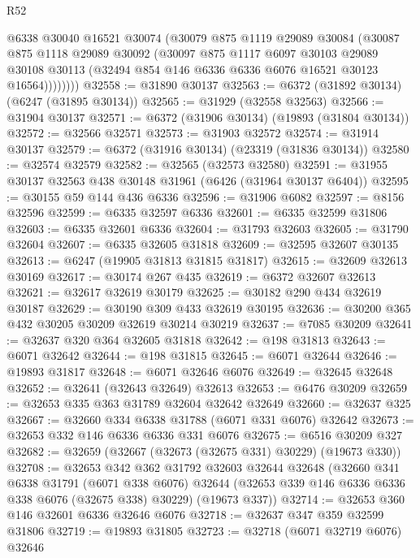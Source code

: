 \begin{lexlean}{R52}
\begin{coremodule}
            @6338
            @30040
            @16521
            @30074
            (@30079
              @875
              @1119
              @29089
              @30084
              (@30087
                @875
                @1118
                @29089
                @30092
                (@30097
                  @875
                  @1117
                  @6097
                  @30103
                  @29089
                  @30108
                  @30113
                  (@32494 @854 @146 @6336 @6336 @6076 @16521 @30123 @16564))))))))
@32558 := @31890 @30137
@32563 := @6372 (@31892 @30134) (@6247 (@31895 @30134))
@32565 := @31929 (@32558 @32563)
@32566 := @31904 @30137
@32571 := @6372 (@31906 @30134) (@19893 (@31804 @30134))
@32572 := @32566 @32571
@32573 := @31903 @32572
@32574 := @31914 @30137
@32579 := @6372 (@31916 @30134) (@23319 (@31836 @30134))
@32580 := @32574 @32579
@32582 := @32565 (@32573 @32580)
@32591 := @31955 @30137 @32563 @438 @30148 @31961 (@6426 (@31964 @30137 @6404))
@32595 := @30155 @59 @144 @436 @6336
@32596 := @31906 @6082
@32597 := @8156 @32596
@32599 := @6335 @32597 @6336
@32601 := @6335 @32599 @31806
@32603 := @6335 @32601 @6336
@32604 := @31793 @32603
@32605 := @31790 @32604
@32607 := @6335 @32605 @31818
@32609 := @32595 @32607 @30135
@32613 := @6247 (@19905 @31813 @31815 @31817)
@32615 := @32609 @32613 @30169
@32617 := @30174 @267 @435
@32619 := @6372 @32607 @32613
@32621 := @32617 @32619 @30179
@32625 := @30182 @290 @434 @32619 @30187
@32629 := @30190 @309 @433 @32619 @30195
@32636 := @30200 @365 @432 @30205 @30209 @32619 @30214 @30219
@32637 := @7085 @30209
@32641 := @32637 @320 @364 @32605 @31818
@32642 := @198 @31813
@32643 := @6071 @32642
@32644 := @198 @31815
@32645 := @6071 @32644
@32646 := @19893 @31817
@32648 := @6071 @32646 @6076
@32649 := @32645 @32648
@32652 := @32641 (@32643 @32649) @32613
@32653 := @6476 @30209
@32659 := @32653 @335 @363 @31789 @32604 @32642 @32649
@32660 := @32637 @325
@32667 := @32660 @334 @6338 @31788 (@6071 @331 @6076) @32642
@32673 := @32653 @332 @146 @6336 @6336 @331 @6076
@32675 := @6516 @30209 @327
@32682 := @32659 (@32667 (@32673 (@32675 @331) @30229) (@19673 @330))
@32708 := @32653
    @342
    @362
    @31792
    @32603
    @32644
    @32648
    (@32660
      @341
      @6338
      @31791
      (@6071 @338 @6076)
      @32644
      (@32653 @339 @146 @6336 @6336 @338 @6076 (@32675 @338) @30229)
      (@19673 @337))
@32714 := @32653 @360 @146 @32601 @6336 @32646 @6076
@32718 := @32637 @347 @359 @32599 @31806
@32719 := @19893 @31805
@32723 := @32718 (@6071 @32719 @6076) @32646

\end{coremodule}
\end{lexlean}
